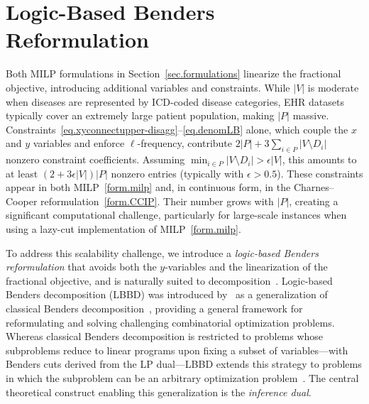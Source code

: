 \section{Logic-Based Benders Reformulation}\label{sec.lbbd}

Both MILP formulations in Section~\ref{sec.formulations} linearize
the fractional objective, introducing additional variables and
constraints. While $|V|$ is moderate when diseases are represented by
ICD-coded disease categories, EHR datasets typically cover an extremely large patient
population, making $|P|$ massive.
Constraints~\eqref{eq.xyconnectupper-disagg}--\eqref{eq.denomLB}
alone, which couple the $x$ and $y$ variables and enforce
$\ell$-frequency, contribute
$2|P| + 3\sum_{i \in P}|V\setminus D_i|$ nonzero constraint
coefficients. Assuming $\min_{i \in P}|V\setminus D_i| > \epsilon|V|$,
this amounts to at least $(2+3\epsilon|V|)|P|$ nonzero entries (typically with
$\epsilon > 0.5$). These constraints appear in both MILP~\eqref{form.milp} and, in continuous form, in the Charnes--Cooper reformulation~\eqref{form.CCIP}. Their number grows with $|P|$, creating a significant computational challenge, particularly for large-scale instances when using a lazy-cut implementation of MILP~\eqref{form.milp}.

To address this scalability challenge, we introduce a
\textit{logic-based Benders reformulation} that avoids both the
$y$-variables and the linearization of the fractional objective, and
is naturally suited to decomposition~\citep{hooker2023logic}. Logic-based
Benders decomposition (LBBD) was introduced by~\cite{Hooker2003} as a
generalization of classical Benders decomposition~\citep{Benders1962},
providing a general framework for reformulating and solving challenging
combinatorial optimization problems. Whereas classical Benders
decomposition is restricted to problems whose subproblems reduce to
linear programs upon fixing a subset of variables---with Benders cuts
derived from the LP dual---LBBD extends this strategy to problems in
which the subproblem can be an arbitrary optimization
problem~\citep{Hooker2019}. The central theoretical construct enabling
this generalization is the \textit{inference dual}.

